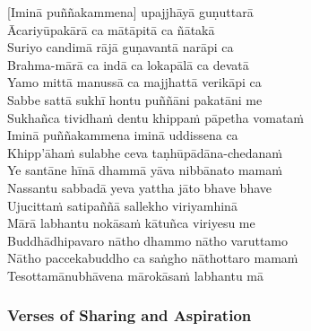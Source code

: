 [Iminā puññakammena] upajjhāyā guṇuttarā\\
Ācariyūpakārā ca mātāpitā ca ñātakā\\
Suriyo candimā rājā guṇavantā narāpi ca\\
Brahma-mārā ca indā ca lokapālā ca devatā\\
Yamo mittā manussā ca majjhattā verikāpi ca\\
Sabbe sattā sukhī hontu puññāni pakatāni me\\
Sukhañca tividhaṁ dentu khippaṁ pāpetha vomataṁ\\
Iminā puññakammena iminā uddissena ca\\
Khipp'āhaṁ sulabhe ceva taṇhūpādāna-chedanaṁ\\
Ye santāne hīnā dhammā yāva nibbānato mamaṁ\\
Nassantu sabbadā yeva yattha jāto bhave bhave\\
Ujucittaṁ satipaññā sallekho viriyamhinā\\
Mārā labhantu nokāsaṁ kātuñca viriyesu me\\
Buddhādhipavaro nātho dhammo nātho varuttamo\\
Nātho paccekabuddho ca saṅgho nāthottaro mamaṁ\\
Tesottamānubhāvena mārokāsaṁ labhantu mā\\


%

\subsubsection{Verses of Sharing and Aspiration}

\begin{leader}
\end{leader}


